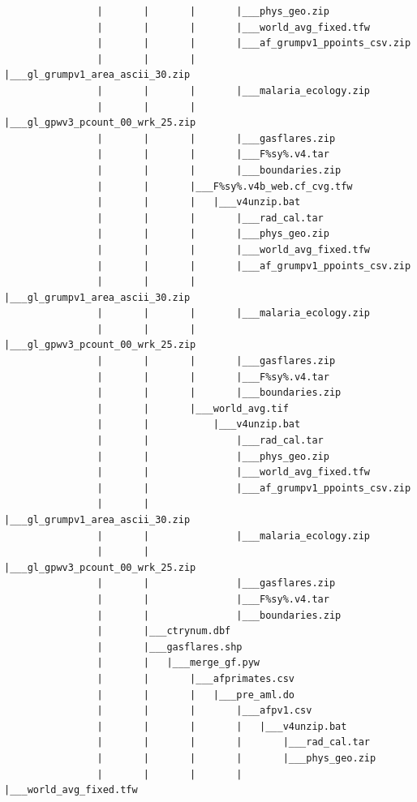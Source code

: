 \documentclass[]{book}
\begin{document}
\begin{verbatim}
                |       |       |       |___phys_geo.zip
                |       |       |       |___world_avg_fixed.tfw
                |       |       |       |___af_grumpv1_ppoints_csv.zip
                |       |       |       |___gl_grumpv1_area_ascii_30.zip
                |       |       |       |___malaria_ecology.zip
                |       |       |       |___gl_gpwv3_pcount_00_wrk_25.zip
                |       |       |       |___gasflares.zip
                |       |       |       |___F%sy%.v4.tar
                |       |       |       |___boundaries.zip
                |       |       |___F%sy%.v4b_web.cf_cvg.tfw
                |       |       |   |___v4unzip.bat
                |       |       |       |___rad_cal.tar
                |       |       |       |___phys_geo.zip
                |       |       |       |___world_avg_fixed.tfw
                |       |       |       |___af_grumpv1_ppoints_csv.zip
                |       |       |       |___gl_grumpv1_area_ascii_30.zip
                |       |       |       |___malaria_ecology.zip
                |       |       |       |___gl_gpwv3_pcount_00_wrk_25.zip
                |       |       |       |___gasflares.zip
                |       |       |       |___F%sy%.v4.tar
                |       |       |       |___boundaries.zip
                |       |       |___world_avg.tif
                |       |           |___v4unzip.bat
                |       |               |___rad_cal.tar
                |       |               |___phys_geo.zip
                |       |               |___world_avg_fixed.tfw
                |       |               |___af_grumpv1_ppoints_csv.zip
                |       |               |___gl_grumpv1_area_ascii_30.zip
                |       |               |___malaria_ecology.zip
                |       |               |___gl_gpwv3_pcount_00_wrk_25.zip
                |       |               |___gasflares.zip
                |       |               |___F%sy%.v4.tar
                |       |               |___boundaries.zip
                |       |___ctrynum.dbf
                |       |___gasflares.shp
                |       |   |___merge_gf.pyw
                |       |       |___afprimates.csv
                |       |       |   |___pre_aml.do
                |       |       |       |___afpv1.csv
                |       |       |       |   |___v4unzip.bat
                |       |       |       |       |___rad_cal.tar
                |       |       |       |       |___phys_geo.zip
                |       |       |       |       |___world_avg_fixed.tfw

\end{verbatim}
\end{document}
